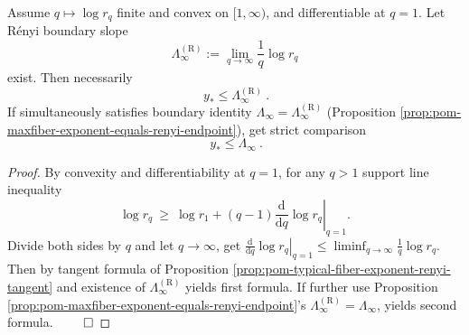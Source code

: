 \begin{proposition}[Convex cone monotonicity: convexity of \texorpdfstring{$q\mapsto\log r_q$}{q->log rq} forces \texorpdfstring{$y_\ast\le\Lambda_\infty$}{y*<=Lambda_infty}]\label{prop:pom-convexity-forces-typical-le-worst}
Assume \(q\mapsto \log r_q\) finite and convex on \([1,\infty)\), and differentiable at \(q=1\).
Let Rényi boundary slope
\[
\Lambda_\infty^{(\mathrm R)}:=\lim_{q\to\infty}\frac{1}{q}\log r_q
\]
exist.
Then necessarily
\[
\boxed{\ y_\ast\le \Lambda_\infty^{(\mathrm R)}\ }.
\]
If simultaneously satisfies boundary identity \(\Lambda_\infty=\Lambda_\infty^{(\mathrm R)}\) (Proposition \ref{prop:pom-maxfiber-exponent-equals-renyi-endpoint}), get strict comparison
\[
\boxed{\ y_\ast\le \Lambda_\infty\ }.
\]
\end{proposition}
\begin{proof}
By convexity and differentiability at \(q=1\), for any \(q>1\) support line inequality
\[
\log r_q\ \ge\ \log r_1+(q-1)\left.\frac{\mathrm d}{\mathrm dq}\log r_q\right|_{q=1}.
\]
Divide both sides by \(q\) and let \(q\to\infty\), get
\(
\left.\frac{\mathrm d}{\mathrm dq}\log r_q\right|_{q=1}\le \liminf_{q\to\infty}\frac{1}{q}\log r_q
\).
Then by tangent formula of Proposition \ref{prop:pom-typical-fiber-exponent-renyi-tangent} and existence of \(\Lambda_\infty^{(\mathrm R)}\) yields first formula.
If further use Proposition \ref{prop:pom-maxfiber-exponent-equals-renyi-endpoint}'s \(\Lambda_\infty^{(\mathrm R)}=\Lambda_\infty\), yields second formula. $\qed$
\end{proof}

